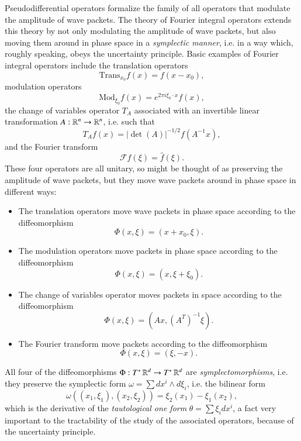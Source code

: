 Pseudodifferential operators formalize the family of all operators that modulate the amplitude of wave packets. The theory of Fourier integral operators extends this theory by not only modulating the amplitude of wave packets, but also moving them around in phase space in a \emph{symplectic manner}, i.e. in a way which, roughly speaking, obeys the uncertainty principle. Basic examples of Fourier integral operators include the translation operators
%
\[ \text{Trans}_{x_0} f(x) = f(x - x_0), \]
%
modulation operators
%
\[ \text{Mod}_{\xi_0} f(x) = e^{2 \pi i \xi_0 \cdot x} f(x), \]
%
the change of variables operator $T_A$ associated with an invertible linear transformation $A: \operatorname{\mathbb{R}}^n \to \operatorname{\mathbb{R}}^n$, i.e. such that
%
\[ T_A f(x) =  |\det(A)|^{-1/2} f(A^{-1} x), \]
%
and the Fourier transform
%
\[ \mathcal{F}f(\xi) = \widehat{f}(\xi). \]
%
These four operators are all unitary, so might be thought of as preserving the amplitude of wave packets, but they move wave packets around in phase space in different ways:
%
\begin{itemize}
    \item The translation operators move wave packets in phase space according to the diffeomorphism
    \[ \Phi(x,\xi) = (x + x_0, \xi). \]

    \item The modulation operators move packets in phase space according to the diffeomorphism
    \[ \Phi(x,\xi) = (x,\xi + \xi_0). \]

    \item The change of variables operator moves packets in space according to the diffeomorphism
    \[ \Phi(x,\xi) = (Ax, (A^T)^{-1} \xi). \]

    \item The Fourier transform move packets according to the diffeomorphism
    \[ \Phi(x,\xi) = (\xi,-x). \]
\end{itemize}
%
All four of the diffeomorphisms $\Phi: T^* \operatorname{\mathbb{R}}^d \to T^* \operatorname{\mathbb{R}}^d$ are \emph{symplectomorphisms}, i.e. they preserve the symplectic form $\omega = \sum dx^i \wedge d\xi_i$, i.e. the bilinear form
%
\[ \omega((x_1,\xi_1), (x_2,\xi_2)) = \xi_2(x_1) - \xi_1(x_2), \]
%
which is the derivative of the \emph{tautological one form} $\theta = \sum \xi_i dx^i$, a fact very important to the tractability of the study of the associated operators, because of the uncertainty principle.

